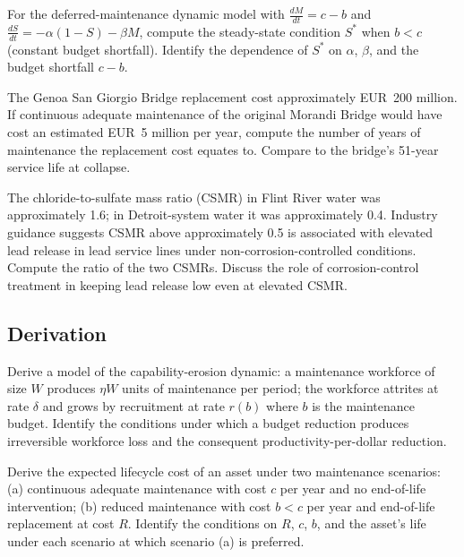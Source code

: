 \begin{exercise}
For the deferred-maintenance dynamic model with $\frac{dM}{dt} = c - b$ and $\frac{dS}{dt} = -\alpha(1-S) - \beta M$, compute the steady-state condition $S^*$ when $b < c$ (constant budget shortfall). Identify the dependence of $S^*$ on $\alpha$, $\beta$, and the budget shortfall $c - b$.
\end{exercise}

\begin{exercise}
The Genoa San Giorgio Bridge replacement cost approximately EUR~200 million. If continuous adequate maintenance of the original Morandi Bridge would have cost an estimated EUR~5 million per year, compute the number of years of maintenance the replacement cost equates to. Compare to the bridge's 51-year service life at collapse.
\end{exercise}

\begin{exercise}
The chloride-to-sulfate mass ratio (CSMR) in Flint River water was approximately 1.6; in Detroit-system water it was approximately 0.4. Industry guidance suggests CSMR above approximately 0.5 is associated with elevated lead release in lead service lines under non-corrosion-controlled conditions. Compute the ratio of the two CSMRs. Discuss the role of corrosion-control treatment in keeping lead release low even at elevated CSMR.
\end{exercise}

\subsection*{Derivation}

\begin{exercise}
Derive a model of the capability-erosion dynamic: a maintenance workforce of size $W$ produces $\eta W$ units of maintenance per period; the workforce attrites at rate $\delta$ and grows by recruitment at rate $r(b)$ where $b$ is the maintenance budget. Identify the conditions under which a budget reduction produces irreversible workforce loss and the consequent productivity-per-dollar reduction.
\end{exercise}

\begin{exercise}
Derive the expected lifecycle cost of an asset under two maintenance scenarios: (a) continuous adequate maintenance with cost $c$ per year and no end-of-life intervention; (b) reduced maintenance with cost $b < c$ per year and end-of-life replacement at cost $R$. Identify the conditions on $R$, $c$, $b$, and the asset's life under each scenario at which scenario (a) is preferred.
\end{exercise}

